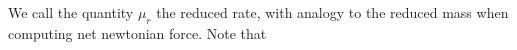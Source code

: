 We call the quantity \(\mu_r\) the reduced rate, with analogy to the reduced mass when computing net newtonian force.  Note that